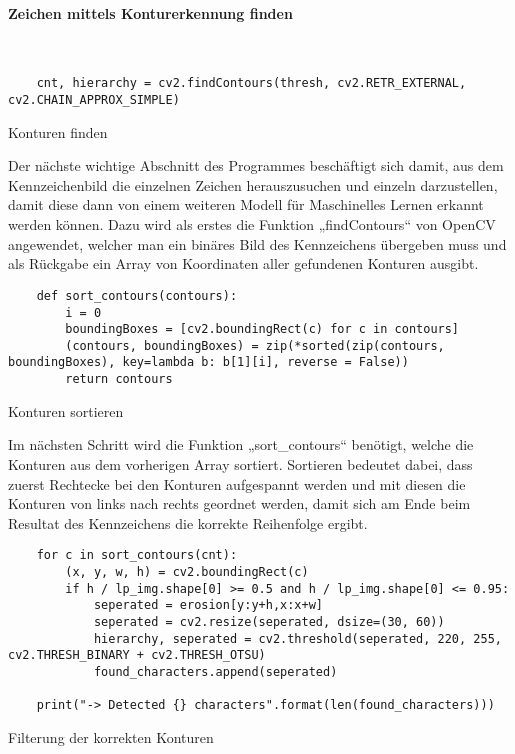 \paragraph{Zeichen mittels Konturerkennung finden}\mbox{}\\

\begin{listing}[H]
    \begin{verbatim}
    cnt, hierarchy = cv2.findContours(thresh, cv2.RETR_EXTERNAL, cv2.CHAIN_APPROX_SIMPLE)
    \end{verbatim}
    \caption{Konturen finden}
\end{listing}

Der nächste wichtige Abschnitt des Programmes beschäftigt sich damit, aus dem Kennzeichenbild die einzelnen Zeichen herauszusuchen und einzeln 
darzustellen, damit diese dann von einem weiteren Modell für Maschinelles Lernen erkannt werden können. Dazu wird als erstes die Funktion „findContours“ 
von OpenCV angewendet, welcher man ein binäres Bild des Kennzeichens übergeben muss und als Rückgabe ein Array von Koordinaten aller gefundenen Konturen ausgibt. 

\begin{listing}[H]
    \begin{verbatim}
    def sort_contours(contours):
        i = 0
        boundingBoxes = [cv2.boundingRect(c) for c in contours]
        (contours, boundingBoxes) = zip(*sorted(zip(contours, boundingBoxes), key=lambda b: b[1][i], reverse = False))
        return contours
    \end{verbatim}
    \caption{Konturen sortieren}
\end{listing}

Im nächsten Schritt wird die Funktion „sort{\_}contours“ benötigt, welche die Konturen aus dem vorherigen Array sortiert. Sortieren bedeutet dabei, 
dass zuerst Rechtecke bei den Konturen aufgespannt werden und mit diesen die Konturen von links nach rechts geordnet werden, damit sich am Ende beim Resultat 
des Kennzeichens die korrekte Reihenfolge ergibt.

\begin{listing}[H]
    \begin{verbatim}
    for c in sort_contours(cnt):
        (x, y, w, h) = cv2.boundingRect(c)
        if h / lp_img.shape[0] >= 0.5 and h / lp_img.shape[0] <= 0.95: 
            seperated = erosion[y:y+h,x:x+w]
            seperated = cv2.resize(seperated, dsize=(30, 60))
            hierarchy, seperated = cv2.threshold(seperated, 220, 255, cv2.THRESH_BINARY + cv2.THRESH_OTSU)
            found_characters.append(seperated)

    print("-> Detected {} characters".format(len(found_characters)))
    \end{verbatim}
    \caption{Filterung der korrekten Konturen}
\end{listing}

